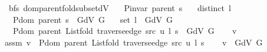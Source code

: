 \begin{isabellebody}
{\isafoldproof}%
%
\isadelimproof
%
\endisadelimproof
%
\isadelimdocument
%
\endisadelimdocument
%
\isatagdocument
%
\isamarkuptrue%
%
\isamarkuptrue%
%
\endisatagdocument
{\isafolddocument}%
%
\isadelimdocument
%
\endisadelimdocument
{}\isamarkupfalse%
\ {\isacharparenleft}{\kern0pt}\ bfs{\isacharparenright}{\kern0pt}\ dom{\isacharunderscore}{\kern0pt}parent{\isacharunderscore}{\kern0pt}fold{\isacharunderscore}{\kern0pt}subset{\isacharunderscore}{\kern0pt}dV{\isacharcolon}{\kern0pt}\isanewline
\ \ \ {\isachardoublequoteopen}P{\isacharunderscore}{\kern0pt}invar\ {\isacharparenleft}{\kern0pt}parent\ s{\isacharparenright}{\kern0pt}{\isachardoublequoteclose}\isanewline
\ \ \ {\isachardoublequoteopen}distinct\ l{\isachardoublequoteclose}\isanewline
\ \ \ {\isachardoublequoteopen}P{\isachardot}{\kern0pt}dom\ {\isacharparenleft}{\kern0pt}parent\ s{\isacharparenright}{\kern0pt}\ {\isasymsubseteq}\ G{\isachardot}{\kern0pt}dV\ G{\isachardoublequoteclose}\isanewline
\ \ \ {\isachardoublequoteopen}set\ l\ {\isasymsubseteq}\ G{\isachardot}{\kern0pt}dV\ G{\isachardoublequoteclose}\isanewline
\ \ \ {\isachardoublequoteopen}P{\isachardot}{\kern0pt}dom\ {\isacharparenleft}{\kern0pt}parent\ {\isacharparenleft}{\kern0pt}List{\isachardot}{\kern0pt}fold\ {\isacharparenleft}{\kern0pt}traverse{\isacharunderscore}{\kern0pt}edge\ src\ u{\isacharparenright}{\kern0pt}\ l\ s{\isacharparenright}{\kern0pt}{\isacharparenright}{\kern0pt}\ {\isasymsubseteq}\ G{\isachardot}{\kern0pt}dV\ G{\isachardoublequoteclose}\isanewline
%
\isadelimproof
%
\endisadelimproof
%
\isatagproof
{}\isamarkupfalse%
\isanewline
\ \ \isamarkupfalse%
\ v\isanewline
\ \ \isamarkupfalse%
\ assm{\isacharcolon}{\kern0pt}\ {\isachardoublequoteopen}v\ {\isasymin}\ P{\isachardot}{\kern0pt}dom\ {\isacharparenleft}{\kern0pt}parent\ {\isacharparenleft}{\kern0pt}List{\isachardot}{\kern0pt}fold\ {\isacharparenleft}{\kern0pt}traverse{\isacharunderscore}{\kern0pt}edge\ src\ u{\isacharparenright}{\kern0pt}\ l\ s{\isacharparenright}{\kern0pt}{\isacharparenright}{\kern0pt}{\isachardoublequoteclose}\isanewline
\ \ \isamarkupfalse%
\ {\isachardoublequoteopen}v\ {\isasymin}\ G{\isachardot}{\kern0pt}dV\ G{\isachardoublequoteclose}\isanewline
\ \ \isamarkupfalse%

\end{isabellebody}

